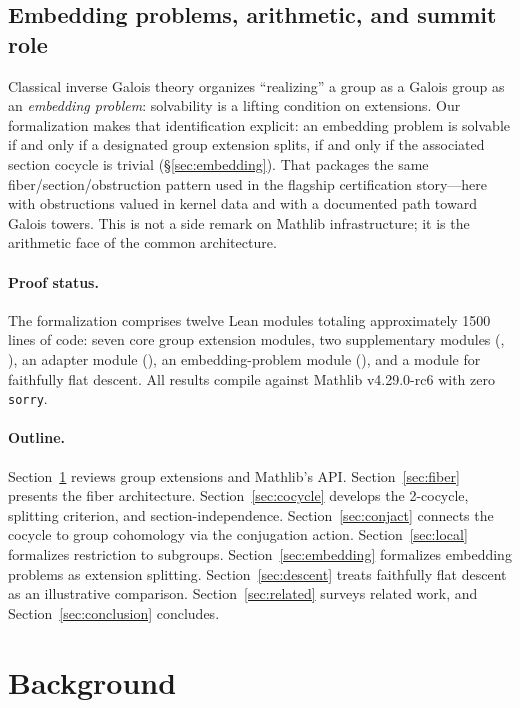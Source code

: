 \documentclass[11pt]{article}
\newcommand{\lean}[1]{\texttt{#1}}
\begin{document}
\subsection{Embedding problems, arithmetic, and summit role}\label{sec:intro-summit}
Classical inverse Galois theory organizes ``realizing'' a group as a Galois group
as an \emph{embedding problem}: solvability is a lifting condition on extensions.
Our formalization makes that identification explicit: an embedding problem is solvable
if and only if a designated group extension splits, if and only if the associated
section cocycle is trivial (\S\ref{sec:embedding}). That packages the same
fiber/section/obstruction pattern used in the flagship certification story---here with
obstructions valued in kernel data and with a documented path toward Galois towers.
This is not a side remark on Mathlib infrastructure; it is the arithmetic face of the
common architecture.

\paragraph{Proof status.}
The formalization comprises twelve Lean modules totaling approximately 1500 lines
of code: seven core group extension modules, two supplementary modules
(, ), an adapter
module (), an embedding-problem module
(), and a module for faithfully flat descent.
All results compile against Mathlib v4.29.0-rc6 with zero \lean{sorry}.

\paragraph{Outline.}
Section~\ref{sec:background} reviews group extensions and Mathlib's API.
Section~\ref{sec:fiber} presents the fiber architecture.
Section~\ref{sec:cocycle} develops the 2-cocycle, splitting criterion, and
section-independence.
Section~\ref{sec:conjact} connects the cocycle to group cohomology via the
conjugation action.
Section~\ref{sec:local} formalizes restriction to subgroups.
Section~\ref{sec:embedding} formalizes embedding problems as extension splitting.
Section~\ref{sec:descent} treats faithfully flat descent as an illustrative
comparison.
Section~\ref{sec:related} surveys related work, and Section~\ref{sec:conclusion}
concludes.

\section{Background}\label{sec:background}
\end{document}
